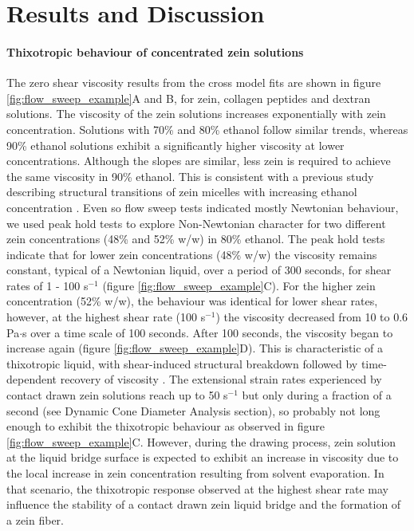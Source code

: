 \documentclass[lineno]{JFM-FLM_Au}
\begin{document}
\section{Results and Discussion}
\paragraph*{Thixotropic behaviour of concentrated zein solutions}
The zero shear viscosity results from the cross model fits are shown in figure \ref{fig:flow_sweep_example}A and B, for zein, collagen peptides and dextran \cite{chowdhry_polymer_2021} solutions. The viscosity of the zein solutions increases exponentially with zein concentration. Solutions with 70\% and 80\% ethanol follow similar trends, whereas 90\% ethanol solutions exhibit a significantly higher viscosity at lower concentrations. Although the slopes are similar, less zein is required to achieve the same viscosity in 90\% ethanol. This is consistent with a previous study describing structural transitions of zein micelles with increasing ethanol concentration \cite{kim_aggregate_2008}. Even so flow sweep tests indicated mostly Newtonian behaviour, we used peak hold tests to explore Non-Newtonian character for two different zein concentrations (48\% and 52\% w/w) in 80\% ethanol. The peak hold tests indicate that for lower zein concentrations (48\% w/w) the viscosity remains constant, typical of a Newtonian liquid, over a period of 300 seconds, for shear rates of 1 - 100 s$^{-1}$ (figure \ref{fig:flow_sweep_example}C). For the higher zein concentration (52\% w/w), the behaviour was identical for lower shear rates, however, at the highest shear rate (100 s$^{-1}$) the viscosity decreased from 10 to 0.6 Pa$\cdot$s over a time scale of 100 seconds. After 100 seconds, the viscosity began to increase again (figure \ref{fig:flow_sweep_example}D). This is characteristic of a thixotropic liquid, with shear-induced structural breakdown followed by time-dependent recovery of viscosity \cite{larson_review_2019}. The extensional strain rates experienced by contact drawn zein solutions reach up to 50 s$^{-1}$ but only during a fraction of a second (see Dynamic Cone Diameter Analysis section), so probably not long enough to exhibit the thixotropic behaviour as observed in figure \ref{fig:flow_sweep_example}C. However, during the drawing process, zein solution at the liquid bridge surface is expected to exhibit an increase in viscosity due to the local increase in zein concentration resulting from solvent evaporation. In that scenario, the thixotropic response observed at the highest shear rate may influence the stability of a contact drawn zein liquid bridge and the formation of a zein fiber.
\end{document}
